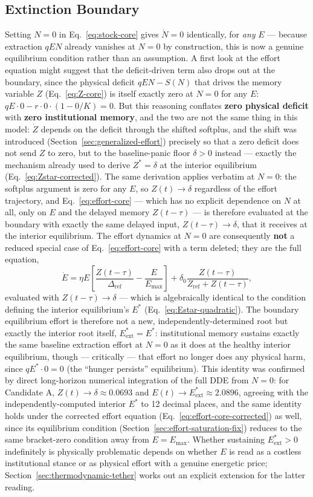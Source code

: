 \documentclass[twocolumn,10pt]{article}
\begin{document}
\subsection{Extinction Boundary}
Setting \(N=0\) in Eq.~\eqref{eq:stock-core} gives $\dot N=0$ identically, for \emph{any} $E$ — because extraction $qEN$ already vanishes at $N=0$ by construction, this is now a genuine equilibrium condition rather than an assumption. A first look at the effort equation might suggest that the deficit-driven term also drops out at the boundary, since the physical deficit $qEN-S(N)$ that drives the memory variable $Z$ (Eq.~\eqref{eq:Z-core}) is itself exactly zero at $N=0$ for any $E$: $qE\cdot0-r\cdot0\cdot(1-0/K)=0$. But this reasoning conflates \textbf{zero physical deficit} with \textbf{zero institutional memory}, and the two are not the same thing in this model: $\dot Z$ depends on the deficit through the shifted softplus, and the shift was introduced (Section~\ref{sec:generalized-effort}) precisely so that a zero deficit does not send $Z$ to zero, but to the baseline-panic floor $\delta>0$ instead — exactly the mechanism already used to derive $Z^*=\delta$ at the interior equilibrium (Eq.~\eqref{eq:Zstar-corrected}). The same derivation applies verbatim at $N=0$: the softplus argument is zero for any $E$, so $Z(t)\to\delta$ regardless of the effort trajectory, and Eq.~\eqref{eq:effort-core} — which has no explicit dependence on $N$ at all, only on $E$ and the delayed memory $Z(t-\tau)$ — is therefore evaluated at the boundary with exactly the same delayed input, $Z(t-\tau)\to\delta$, that it receives at the interior equilibrium. The effort dynamics at $N=0$ are consequently \textbf{not} a reduced special case of Eq.~\eqref{eq:effort-core} with a term deleted; they are the full equation,
\[
\dot{E} = \eta E \left[ \frac{Z(t-\tau)}{\Delta_{\text{ref}}} - \frac{E}{E_{\max}} \right] + \delta_0 \frac{Z(t-\tau)}{Z_{\text{ref}} + Z(t-\tau)},
\]
evaluated with $Z(t-\tau)\to\delta$ — which is algebraically identical to the condition defining the interior equilibrium's $E^*$ (Eq.~\eqref{eq:Estar-quadratic}). The boundary equilibrium effort is therefore not a new, independently-determined root but exactly the interior root itself, $E^*_{\text{ext}}=E^*$: institutional memory sustains exactly the same baseline extraction effort at $N=0$ as it does at the healthy interior equilibrium, though — critically — that effort no longer does any physical harm, since $qE^*\cdot 0=0$ (the ``hunger persists'' equilibrium). This identity was confirmed by direct long-horizon numerical integration of the full DDE from $N=0$: for Candidate A, $Z(t)\to\delta\approx0.0693$ and $E(t)\to E^*_{\text{ext}}\approx2.0896$, agreeing with the independently-computed interior $E^*$ to 12 decimal places, and the same identity holds under the corrected effort equation (Eq.~\eqref{eq:effort-core-corrected}) as well, since its equilibrium condition (Section~\ref{sec:effort-saturation-fix}) reduces to the same bracket-zero condition away from $E=E_{\max}$. Whether sustaining $E^*_{\text{ext}}>0$ indefinitely is physically problematic depends on whether $E$ is read as a costless institutional stance or as physical effort with a genuine energetic price; Section~\ref{sec:thermodynamic-tether} works out an explicit extension for the latter reading.
\end{document}
